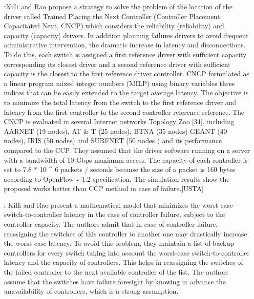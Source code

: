 \documentclass[a4paper,10pt]{article}
\begin{document}


\cite{KiRa17}:Killi and Rao propose a strategy to solve the problem of the location of the driver called Trained Placing the Next Controller (Controller Placement Capacitated Next, CNCP) which considers the reliability (reliability) and capacity (capacity) drivers. In addition planning failures drivers to avoid frequent administrative intervention, the dramatic increase in latency and disconnections. To do this, each switch is assigned a first reference driver with sufficient capacity corresponding its closest driver and a second reference driver with sufficient capacity is the closest to the first reference driver controller. CNCP formulated as a linear program mixed integer numbers (MILP) using binary variables three indices that can be easily extended to the target average latency. The objective is to minimize the total latency from the switch to the first reference driver and latency from the first controller to the second controller reference reference.
The CNCP is evaluated in several Internet networks Topology Zoo [34], including AARNET (19 nodes), AT & T (25 nodes), BTNA (35 nodes) GEANT (40 nodes), IRIS (50 nodes) and SURFNET (50 nodes ) and its performance compared to the CCP.
They assumed that the driver software running on a server with a bandwidth of 10 Gbps maximum access. The capacity of each controller is set to 7.8 * 10 ^ 6 packets / seconds because the size of a packet is 160 bytes according to OpenFlow 
v 1.2 specification.
The simulation results show the proposed works better than CCP method in case of failure.[USTA]

\cite{KiRa16}: Killi and Rao present a mathematical model that minimizes the worst-case switch-to-controller latency in the case of controller failure, subject to the controller capacity. The authors admit that in case of controller failure, reassigning the switches of this controller to another one may drastically increase the worst-case latency. To avoid this problem, they maintain a list of backup controllers for every switch taking into account the worst-case switch-to-controller latency and the capacity of controllers. This helps in reassigning the switches of the failed controller to the next available controller of the list. The authors assume that the switches have failure foresight by knowing in advance the unavailability of controllers, which is a strong assumption.  
\end{document}

